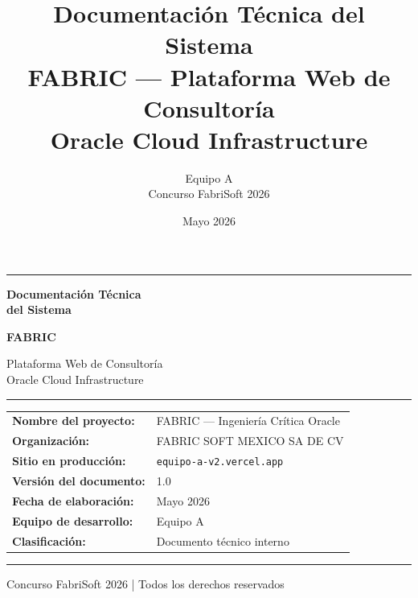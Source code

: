 \documentclass[12pt, a4paper, twoside]{report}
\title{%
  {\Huge\bfseries Documentación Técnica del Sistema}\\[0.5em]
  {\large FABRIC — Plataforma Web de Consultoría\\
  Oracle Cloud Infrastructure}
}
\author{Equipo A \\ Concurso FabriSoft 2026}
\date{Mayo 2026}
\begin{document}

\begin{titlepage}
  \centering
  \vspace*{2cm}

  {\color{fabricgold}\rule{\linewidth}{2pt}}
  \vspace{1cm}

  {\Huge\bfseries Documentación Técnica\\[0.3em]
   del Sistema\par}
  \vspace{1.2cm}

  {\LARGE\bfseries\color{fabricgold} FABRIC\par}
  \vspace{0.5cm}
  {\large Plataforma Web de Consultoría\\
  Oracle Cloud Infrastructure\par}

  \vspace{1.5cm}
  {\color{fabricgold}\rule{0.4\linewidth}{0.6pt}}
  \vspace{1.5cm}

  \begin{tabular}{ll}
    \textbf{Nombre del proyecto:} & FABRIC — Ingeniería Crítica Oracle \\[4pt]
    \textbf{Organización:}        & FABRIC SOFT MEXICO SA DE CV \\[4pt]
    \textbf{Sitio en producción:} & \texttt{equipo-a-v2.vercel.app} \\[4pt]
    \textbf{Versión del documento:} & 1.0 \\[4pt]
    \textbf{Fecha de elaboración:} & Mayo 2026 \\[4pt]
    \textbf{Equipo de desarrollo:} & Equipo A \\[4pt]
    \textbf{Clasificación:}       & Documento técnico interno \\
  \end{tabular}

  \vfill
  {\color{fabricgold}\rule{\linewidth}{2pt}}
  \vspace{0.3cm}
  {\small\color{fabricgray} Concurso FabriSoft 2026 \quad|\quad
   Todos los derechos reservados}
\end{titlepage}

\tableofcontents
\clearpage
\end{document}
